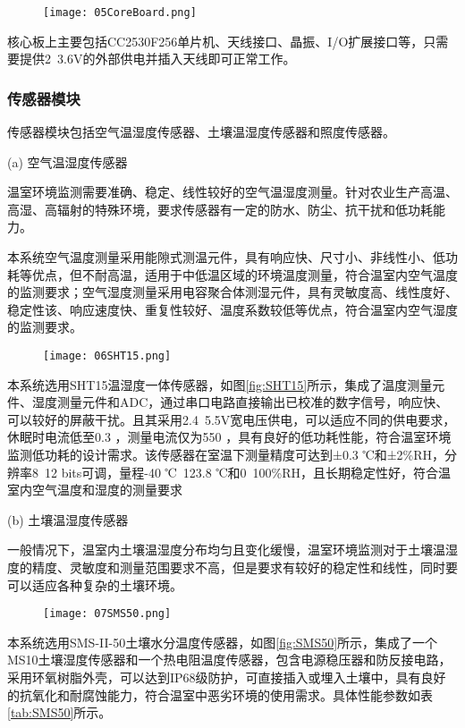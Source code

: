 		\begin{figure}[!htbp]
  			\centering
 			\texttt{[image: 05CoreBoard.png]}
		\end{figure}	
		核心板上主要包括CC2530F256单片机、天线接口、晶振、I/O扩展接口等，只需要提供2~3.6V的外部供电并插入天线即可正常工作。
		\subsubsection{传感器模块}
		传感器模块包括空气温湿度传感器、土壤温湿度传感器和照度传感器。
		
		(a) 空气温湿度传感器
		
		温室环境监测需要准确、稳定、线性较好的空气温湿度测量。针对农业生产高温、高湿、高辐射的特殊环境，要求传感器有一定的防水、防尘、抗干扰和低功耗能力。
		
		本系统空气温度测量采用能隙式测温元件，具有响应快、尺寸小、非线性小、低功耗等优点，但不耐高温，适用于中低温区域的环境温度测量，符合温室内空气温度的监测要求；空气湿度测量采用电容聚合体测湿元件，具有灵敏度高、线性度好、稳定性该、响应速度快、重复性较好、温度系数较低等优点，符合温室内空气湿度的监测要求。
		
 		\begin{figure}[!htbp]
  			\centering
 			\texttt{[image: 06SHT15.png]}
		\end{figure}
		本系统选用SHT15温湿度一体传感器，如图\ref{fig:SHT15}所示，集成了温度测量元件、湿度测量元件和ADC，通过串口电路直接输出已校准的数字信号，响应快、可以较好的屏蔽干扰。且其采用2.4~5.5V宽电压供电，可以适应不同的供电要求，休眠时电流低至0.3 ，测量电流仅为550 ，具有良好的低功耗性能，符合温室环境监测低功耗的设计需求。该传感器在室温下测量精度可达到±0.3 ℃和±2\%RH，分辨率8~12 bits可调，量程-40 ℃~123.8 ℃和0~100\%RH，且长期稳定性好，符合温室内空气温度和湿度的测量要求
		
		(b) 土壤温湿度传感器
		
		一般情况下，温室内土壤温湿度分布均匀且变化缓慢，温室环境监测对于土壤温湿度的精度、灵敏度和测量范围要求不高，但是要求有较好的稳定性和线性，同时要可以适应各种复杂的土壤环境。
		
  		\begin{figure}[!htbp]
  			\centering
 			\texttt{[image: 07SMS50.png]}
		\end{figure}
		本系统选用SMS-II-50土壤水分温度传感器，如图\ref{fig:SMS50}所示，集成了一个MS10土壤湿度传感器和一个热电阻温度传感器，包含电源稳压器和防反接电路，采用环氧树脂外壳，可以达到IP68级防护，可直接插入或埋入土壤中，具有良好的抗氧化和耐腐蚀能力，符合温室中恶劣环境的使用需求。具体性能参数如表\ref{tab:SMS50}所示。
			
